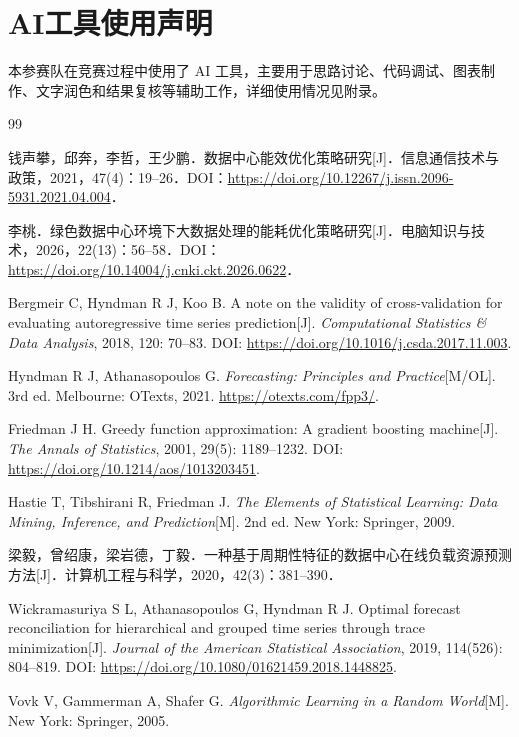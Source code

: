 \section*{AI工具使用声明}

本参赛队在竞赛过程中使用了 AI 工具，主要用于思路讨论、代码调试、图表制作、文字润色和结果复核等辅助工作，详细使用情况见附录。

\begin{thebibliography}{99}
\setlength{\itemsep}{1.35\baselineskip}

钱声攀，邱奔，李哲，王少鹏．数据中心能效优化策略研究[J]．信息通信技术与政策，2021，47(4)：19--26．DOI：\url{https://doi.org/10.12267/j.issn.2096-5931.2021.04.004}．

李桃．绿色数据中心环境下大数据处理的能耗优化策略研究[J]．电脑知识与技术，2026，22(13)：56--58．DOI：\url{https://doi.org/10.14004/j.cnki.ckt.2026.0622}．

Bergmeir C, Hyndman R J, Koo B. A note on the validity of cross-validation for evaluating autoregressive time series prediction[J]. \emph{Computational Statistics \& Data Analysis}, 2018, 120: 70--83. DOI: \url{https://doi.org/10.1016/j.csda.2017.11.003}.

Hyndman R J, Athanasopoulos G. \emph{Forecasting: Principles and Practice}[M/OL]. 3rd ed. Melbourne: OTexts, 2021. \url{https://otexts.com/fpp3/}.

Friedman J H. Greedy function approximation: A gradient boosting machine[J]. \emph{The Annals of Statistics}, 2001, 29(5): 1189--1232. DOI: \url{https://doi.org/10.1214/aos/1013203451}.

Hastie T, Tibshirani R, Friedman J. \emph{The Elements of Statistical Learning: Data Mining, Inference, and Prediction}[M]. 2nd ed. New York: Springer, 2009.

梁毅，曾绍康，梁岩德，丁毅．一种基于周期性特征的数据中心在线负载资源预测方法[J]．计算机工程与科学，2020，42(3)：381--390．

Wickramasuriya S L, Athanasopoulos G, Hyndman R J. Optimal forecast reconciliation for hierarchical and grouped time series through trace minimization[J]. \emph{Journal of the American Statistical Association}, 2019, 114(526): 804--819. DOI: \url{https://doi.org/10.1080/01621459.2018.1448825}.

Vovk V, Gammerman A, Shafer G. \emph{Algorithmic Learning in a Random World}[M]. New York: Springer, 2005.


\end{thebibliography}

